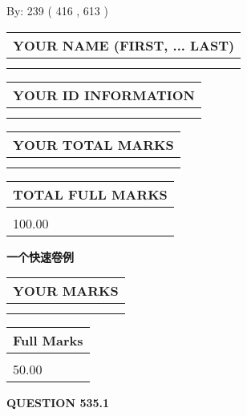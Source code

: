 \documentclass{ctexart}
\begin{document}
   
\hspace{1.0in} By: 
 239 ( 416 ,  613 )
   
   
   
   
\newpage 
\setcounter{page}{ 
   535001 } 
   
   
   
   
\noindent\begin{tabular}{|l|}
\hline
YOUR NAME (FIRST, ... LAST)  \\
\hline
 \\ 
 \\ 
\hline
\end{tabular}
\hspace{0.05in} \begin{tabular}{|l|}
\hline
 YOUR   ID   INFORMATION  \\
\hline
 \\ 
 \\ 
\hline
\end{tabular}
   
   
\vspace{0.2in}\noindent\begin{tabular}{|l|}
\hline
YOUR TOTAL MARKS  \\
\hline
 \\ 
 \\ 
\hline
\end{tabular}
\hspace{0.05in} \begin{tabular}{|l|}
\hline
TOTAL FULL MARKS  \\
\hline
 \\ 
100.00 \\
\hline
\end{tabular}
   
   
 \vspace{0.2in}
{\LARGE {\textbf{ 一个快速卷例}}}
   
   
  
\vspace{0.2in}
  
\noindent\begin{tabular}{|l|}
\hline
 YOUR MARKS  \\
\hline
 \\ 
 \\ 
\hline
\end{tabular}
\hspace{0.05in} \begin{tabular}{|l|}
\hline
 Full Marks  \\
\hline
 \\ 
50.00 \\
\hline
\end{tabular}
{\textbf{\Large{QUESTION
535.1 
}}}
  
\end{document}
